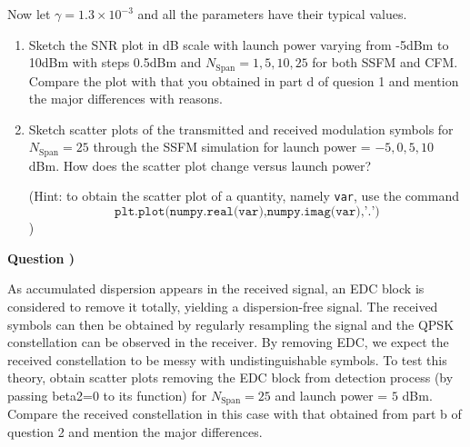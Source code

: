 \documentclass[10pt,letterpaper]{article}
\newcommand{\Span}{\text{Span}}
\newcounter{QuestionNumber}
\newcommand{\Q}{
\textbf{Question \theQuestionNumber)}
\stepcounter{QuestionNumber}
}
\begin{document}
Now let $\gamma=1.3\times 10^{-3}$ and all the parameters have their typical values.
\begin{enumerate}[label=\alph*-]
\item
Sketch the SNR plot in dB scale with launch power varying from -5dBm to 10dBm with steps 0.5dBm and $N_\Span=1,5,10,25$ for both SSFM and CFM.
Compare the plot with that you obtained in part d of quesion 1 and mention the major differences with reasons.
\item
Sketch scatter plots of the transmitted and received modulation symbols for $N_\Span=25$ through the SSFM simulation for launch power = $-5 , 0 ,5, 10$ dBm. How does the scatter plot change versus launch power?

(Hint: to obtain the scatter plot of a quantity, namely \texttt{var}, use the command $$\texttt{plt.plot(numpy.real(var),numpy.imag(var),'.')}$$
)
\end{enumerate}
\Q

As accumulated dispersion appears in the received signal, an EDC block is considered to remove it totally, yielding a dispersion-free signal. The received symbols can then be obtained by regularly resampling the signal and the QPSK constellation can be observed in the receiver. By removing EDC, we expect the received constellation to be messy with undistinguishable symbols. To test this theory, obtain scatter plots removing the EDC block from detection process (by passing beta2=0 to its function) for $N_\Span=25$ and launch power = $5$ dBm. Compare the received constellation in this case with that obtained from part b of question 2 and mention the major differences.
\end{document}
